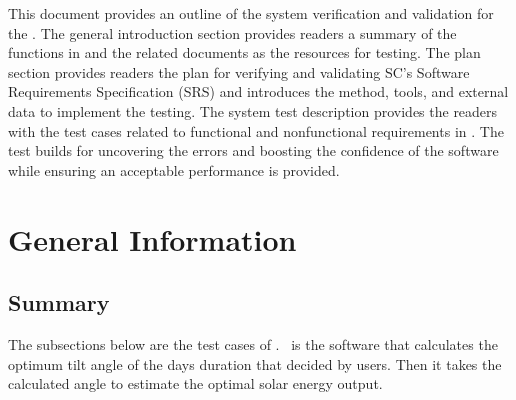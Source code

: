 \documentclass[12pt, titlepage]{article}
\begin{document}



\newpage


This document provides an outline of the system verification and validation for
the \progname. The general introduction section provides readers a summary of
the functions in \progname{} and the related documents as the resources for
testing. The plan section provides readers the plan for verifying and
validating SC's Software Requirements Specification (SRS) and introduces the
method, tools, and external data to implement the testing. The system test
description
provides the readers with the test cases related to functional and nonfunctional
requirements in \progname. The test builds for uncovering the errors and
boosting the confidence of the software while ensuring an acceptable
performance is provided. 



\section{General Information}


\subsection{Summary}

The subsections below are the test cases of \progname. \progname ~is the
software that calculates the optimum tilt angle of the days duration that
decided by users. Then it takes the calculated angle to estimate the optimal
solar energy output.

\end{document}
